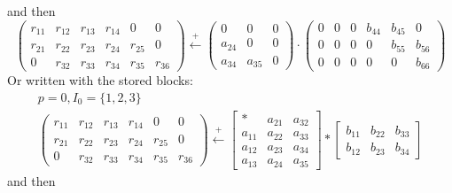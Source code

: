 and then
\begin{displaymath}
  \left(\begin{array}{cccccc}
    r_{11} &r_{12} &r_{13}& r_{14} & 0 & 0\\
    r_{21} &r_{22} &r_{23}& r_{24} & r_{25} & 0\\
    0 &r_{32} &r_{33}& r_{34} & r_{35} & r_{36}
  \end{array}\right) \stackrel{+}{\longleftarrow}
  \left(\begin{array}{ccc}
      0      & 0 & 0\\
      a_{24} & 0 & 0\\
      a_{34} & a_{35} & 0
  \end{array}\right)
\cdot
  \left(\begin{array}{cccccc}
    0 & 0 & 0 &b_{44}& b_{45} & 0 \\
    0 & 0 & 0 & 0 &b_{55}& b_{56}\\
    0 & 0 & 0 & 0 & 0 &b_{66}
  \end{array}\right)
\end{displaymath}
Or written with the stored blocks:
\begin{eqnarray*}
  p=0, I_0=\{1,2,3\}\\
  \left(\begin{array}{cccccc}
    r_{11} &r_{12} &r_{13}& r_{14} & 0 & 0\\
    r_{21} &r_{22} &r_{23}& r_{24} & r_{25} & 0\\
    0 &r_{32} &r_{33}& r_{34} & r_{35} & r_{36}
  \end{array}\right) \stackrel{+}{\longleftarrow}
\left[
  \begin{array}{ccc}
    *     & a_{21} & a_{32}  \\
    a_{11} & a_{22} & a_{33} \\
    a_{12} & a_{23} & a_{34}\\
    a_{13} & a_{24} & a_{35} 
  \end{array}
\right]*
\left[
  \begin{array}{ccc}
    b_{11} & b_{22} & b_{33} \\
    b_{12} & b_{23} & b_{34} 
  \end{array}
\right]
\end{eqnarray*}
and then
